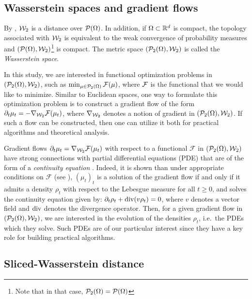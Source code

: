 \subsection{Wasserstein spaces and gradient flows}

%
By \cite[Proposition 7.1.5]{ambrosio2008gradient}, ${\cal W}_2$ is a distance over ${\cal P}(\Omega)$.
In addition, if $\Omega \subset \mathbb{R}^d$ is compact, the topology associated with ${\cal W}_2$ is equivalent to the weak convergence of probability measures and $({\cal P}(\Omega),{\cal W}_2)$\footnote{Note that in that case, ${\cal P}_2(\Omega)={\cal P}(\Omega)$} is compact. The metric space $({\cal P}_2(\Omega),{\cal W}_2) $ is called the \emph{Wasserstein space}.

In this study, we are interested in functional optimization problems in $({\cal P}_2(\Omega),{\cal W}_2)$, such as $\min_{\mu\in{\cal P}_2(\Omega)} {\cal F}(\mu)$, where ${\cal F}$ is the functional that we would like to minimize. Similar to Euclidean spaces, one way to formulate this optimization problem is to construct a gradient flow of the form $\partial_t \mu_t = - \nabla_{{\cal W}_2} {\cal F}(\mu_t)$, where $\nabla_{{\cal W}_2}$ denotes a notion of gradient in $({\cal P}_2(\Omega),{\cal W}_2)$. If such a flow can be constructed, then one can utilize it both for practical algorithms and theoretical analysis.

Gradient flows $\partial_t \mu_t = \nabla_{{\cal W}_2} \mathcal{F}(\mu_t)$ with respect to a functional $\mathcal{F}$ in $({\cal P}_2(\Omega),{\cal W}_2)$ have strong connections with partial differential equations (PDE) that are of the form of a \emph{continuity equation} \cite{santambrogio2017euclidean}. Indeed, it is shown than under appropriate conditions on $\mathcal{F}$ (see \eg \cite{ambrosio2008gradient}), $(\mu_t)_t$ is a solution of the gradient flow if and only if it admits a density $\rho_t$ with respect to the Lebesgue measure for all $t \geq 0$, and solves the continuity equation given by:
$\partial_t \rho_t + \operatorname{div} (v \rho_t) = 0$, %
where $v$ denotes a vector field and $\operatorname{div}$ denotes the divergence operator. Then, for a given gradient flow in $({\cal P}_2(\Omega),{\cal W}_2)$, we are interested in the evolution of the densities $\rho_t$, i.e.\ the PDEs which they solve.
%
Such PDEs are of our particular interest since they have a key role for building practical algorithms.




\subsection{Sliced-Wasserstein distance}

